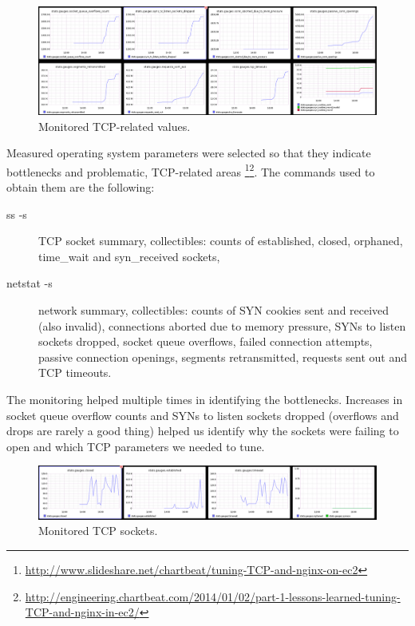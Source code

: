 \documentclass{uvamscse}
\begin{document}
\begin{figure}[H]
\centering
\includegraphics[scale=0.3]{graphiteTCP}
\caption{Monitored TCP-related values.}
\label{figure:TCPstates}
\end{figure}

Measured operating system parameters were selected so that they indicate bottlenecks and problematic, TCP-related areas \footnote{\url{http://www.slideshare.net/chartbeat/tuning-TCP-and-nginx-on-ec2}}\footnote{\url{http://engineering.chartbeat.com/2014/01/02/part-1-lessons-learned-tuning-TCP-and-nginx-in-ec2/}}. The commands used to obtain them are the following:
\begin{description}
  \item [ss -s] TCP socket summary, collectibles: counts of established, closed, orphaned, time\_wait and syn\_received sockets,
  \item [netstat -s] network summary, collectibles: counts of SYN cookies sent and received (also invalid), connections aborted due to memory pressure, SYNs to listen sockets dropped, socket queue overflows, failed connection attempts, passive connection openings, segments retransmitted, requests sent out and TCP timeouts.
\end{description}

The monitoring helped multiple times in identifying the bottlenecks. Increases in socket queue overflow counts and SYNs to listen sockets dropped (overflows and drops are rarely a good thing) helped us identify why the sockets were failing to open and which TCP parameters we needed to tune.

\begin{figure}[H]
\centering
\includegraphics[scale=0.4]{graphitesocket}
\caption{Monitored TCP sockets.}
\label{figure:TCPstates}
\end{figure}
\end{document}
